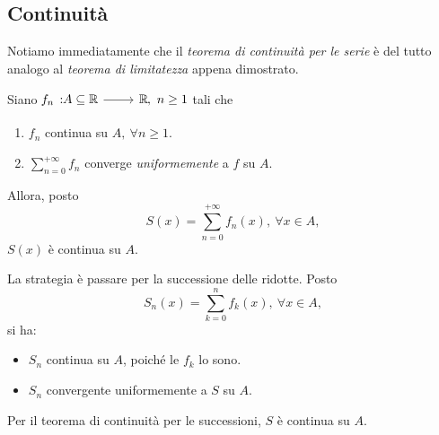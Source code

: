 \subsection{Continuità}
Notiamo immediatamente che il \textit{teorema di continuità per le serie} è del tutto analogo al \textit{teorema di limitatezza} appena dimostrato.
\begin{theorema}
	Siano $\funz{f_n}{A\subseteq\realset}{\realset},\ n\geq 1$ tali che
	\begin{enumerate}
		\item $f_n$ continua su $A,\ \forall n\geq 1$.
		\item $\displaystyle\sum_{n=0}^{+\infty}f_n$ converge \textit{uniformemente} a $f$ su $A$.
	\end{enumerate}
	Allora, posto
	\begin{equation*}
		S(x)=\sum_{n=0}^{+\infty}f_n(x),\ \forall x\in A,
	\end{equation*}
	$S(x)$ è continua su $A$.
\end{theorema}
\begin{demonstration}
	La strategia è passare per la successione delle ridotte.
	Posto
	\begin{equation*}
		S_n(x)=\sum_{k=0}^{n}f_k(x),\ \forall x\in A,
	\end{equation*}
	si ha:
	\begin{itemize}
		\item $S_n$ continua su $A$, poiché le $f_k$ lo sono.
		\item $S_n$ convergente uniformemente a $S$ su $A$.
	\end{itemize}
	Per il teorema di continuità per le successioni, $S$ è continua su $A$.
\end{demonstration}

